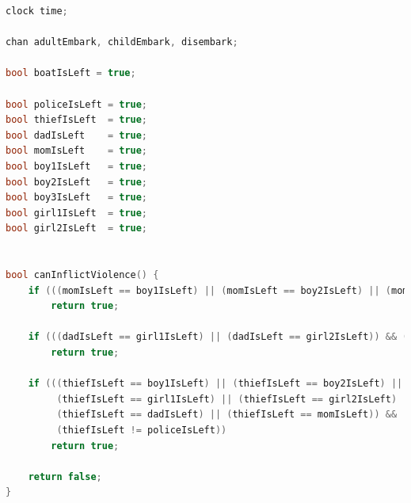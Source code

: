 \documentclass[a4paper,12pt]{scrartcl}
\begin{document}
\begin{lstlisting}[language=CPP, label = lst:plugin_example, caption = Global declarations with an extra boy.]
clock time;

chan adultEmbark, childEmbark, disembark;

bool boatIsLeft = true;

bool policeIsLeft = true;
bool thiefIsLeft  = true;
bool dadIsLeft    = true;
bool momIsLeft    = true;
bool boy1IsLeft   = true;
bool boy2IsLeft   = true;
bool boy3IsLeft   = true;
bool girl1IsLeft  = true;
bool girl2IsLeft  = true;


bool canInflictViolence() {
    if (((momIsLeft == boy1IsLeft) || (momIsLeft == boy2IsLeft) || (momIsLeft == boy3IsLeft)) && (momIsLeft != dadIsLeft))
        return true;

    if (((dadIsLeft == girl1IsLeft) || (dadIsLeft == girl2IsLeft)) && (dadIsLeft != momIsLeft))
        return true;

    if (((thiefIsLeft == boy1IsLeft) || (thiefIsLeft == boy2IsLeft) || (thiefIsLeft == boy3IsLeft) ||
         (thiefIsLeft == girl1IsLeft) || (thiefIsLeft == girl2IsLeft) || 
         (thiefIsLeft == dadIsLeft) || (thiefIsLeft == momIsLeft)) && 
         (thiefIsLeft != policeIsLeft))
        return true;

    return false;
}
\end{lstlisting}
\end{document}
